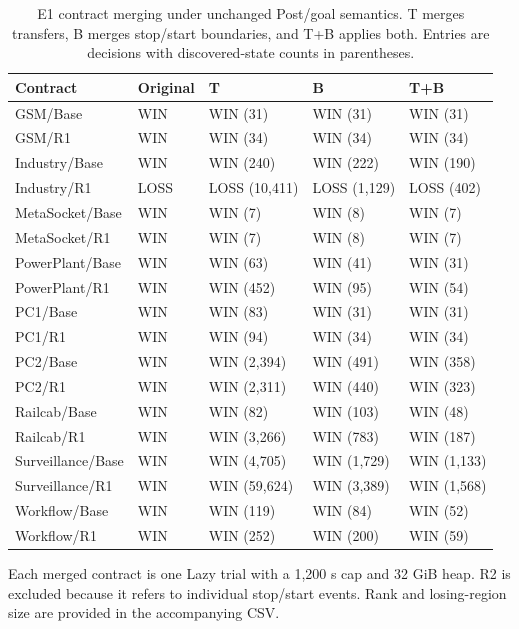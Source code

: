 \begin{table}[t]
\centering\small
\caption{E1 contract merging under unchanged Post/goal semantics. T merges transfers, B merges stop/start boundaries, and T+B applies both. Entries are decisions with discovered-state counts in parentheses.}
\label{tab:abl-e1}
\begin{tabular}{lllll}
\toprule
Contract & Original & T & B & T+B \\
\midrule
GSM/Base & WIN & WIN (31) & WIN (31) & WIN (31) \\
GSM/R1 & WIN & WIN (34) & WIN (34) & WIN (34) \\
Industry/Base & WIN & WIN (240) & WIN (222) & WIN (190) \\
Industry/R1 & LOSS & LOSS (10,411) & LOSS (1,129) & LOSS (402) \\
MetaSocket/Base & WIN & WIN (7) & WIN (8) & WIN (7) \\
MetaSocket/R1 & WIN & WIN (7) & WIN (8) & WIN (7) \\
PowerPlant/Base & WIN & WIN (63) & WIN (41) & WIN (31) \\
PowerPlant/R1 & WIN & WIN (452) & WIN (95) & WIN (54) \\
PC1/Base & WIN & WIN (83) & WIN (31) & WIN (31) \\
PC1/R1 & WIN & WIN (94) & WIN (34) & WIN (34) \\
PC2/Base & WIN & WIN (2,394) & WIN (491) & WIN (358) \\
PC2/R1 & WIN & WIN (2,311) & WIN (440) & WIN (323) \\
Railcab/Base & WIN & WIN (82) & WIN (103) & WIN (48) \\
Railcab/R1 & WIN & WIN (3,266) & WIN (783) & WIN (187) \\
Surveillance/Base & WIN & WIN (4,705) & WIN (1,729) & WIN (1,133) \\
Surveillance/R1 & WIN & WIN (59,624) & WIN (3,389) & WIN (1,568) \\
Workflow/Base & WIN & WIN (119) & WIN (84) & WIN (52) \\
Workflow/R1 & WIN & WIN (252) & WIN (200) & WIN (59) \\
\bottomrule
\end{tabular}
\par\footnotesize Each merged contract is one Lazy trial with a 1,200 s cap and 32 GiB heap. R2 is excluded because it refers to individual stop/start events. Rank and losing-region size are provided in the accompanying CSV.
\end{table}
